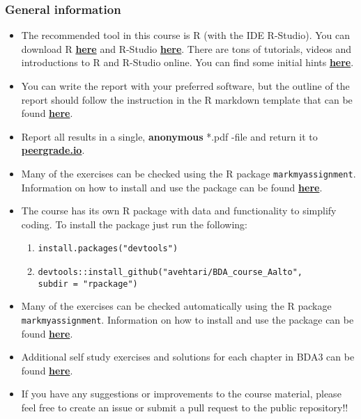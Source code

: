 
\subsubsection*{General information}

\begin{itemize}
\itemsep0em 
\item The recommended tool in this course is R (with the IDE R-Studio). You can download R \href{https://cran.r-project.org/}{\textbf{here}} and R-Studio \href{https://www.rstudio.com/products/rstudio/download/}{\textbf{here}}. There are tons of tutorials, videos and introductions to R and R-Studio online. You can find some initial hints \href{https://www.rstudio.com/online-learning/}{\textbf{here}}. 
\item  You can write the report with your preferred software, but the outline of the report should follow the instruction in the R markdown template that can be found \href{https://raw.githubusercontent.com/avehtari/BDA_course_Aalto/master/templates/assignment_template.rmd}{\textbf{here}}. 
\item  Report all results in a single, {\bf anonymous} *.pdf -file and return it to \href{peergrade.io}{\textbf{peergrade.io}}. 
\item Many of the exercises can be checked using the R package \texttt{markmyassignment}. Information on how to install and use the package can be found \href{https://cran.r-project.org/web/packages/markmyassignment/vignettes/markmyassignment.html}{\textbf{here}}.
\item The course has its own R package with data and functionality to simplify coding. To install the package just run the following:
\begin{enumerate}
\item \texttt{install.packages("devtools")}
\item \texttt{devtools::install\_github("avehtari/BDA\_course\_Aalto", \\ subdir = "rpackage")}
\end{enumerate}
\item Many of the exercises can be checked automatically using the R package \\ \texttt{markmyassignment}. Information on how to install and use the package can be found \href{https://cran.r-project.org/web/packages/markmyassignment/vignettes/markmyassignment.html}{\textbf{here}}.
\item Additional self study exercises and solutions for each chapter in BDA3 can be found \href{http://www.stat.columbia.edu/~gelman/book/solutions3.pdf}{\textbf{here}}.
\item If you have any suggestions or improvements to the course material, please feel free to create an issue or submit a pull request to the public repository!!
\end{itemize}